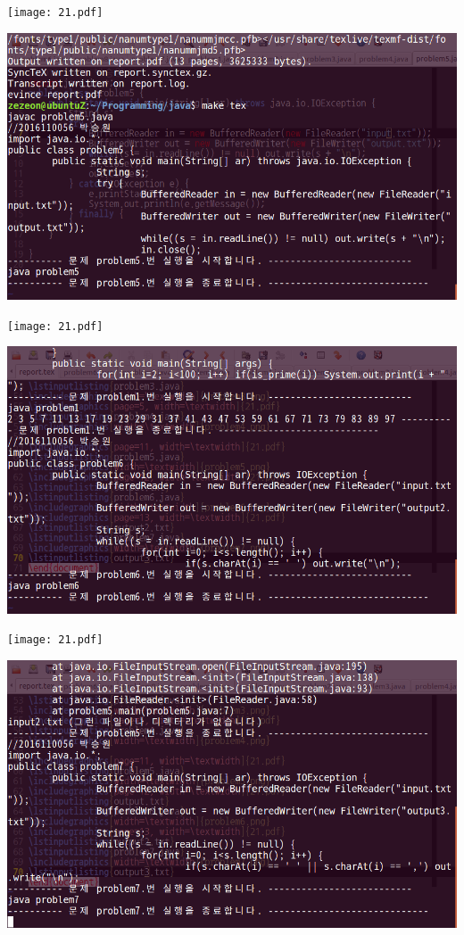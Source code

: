 \documentclass[12pt,a4paper]{article}
\begin{document}
\texttt{[image: 21.pdf]}

\includegraphics[width=\textwidth]{problem5.png}

\texttt{[image: 21.pdf]}

\includegraphics[width=\textwidth]{problem6.png}

\texttt{[image: 21.pdf]}

\includegraphics[width=\textwidth]{problem7.png}

\end{document}
